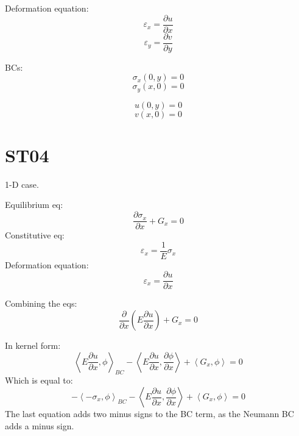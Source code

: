 \documentclass[11pt,letterpaper]{article}
\begin{document}
Deformation equation:
\begin{equation}
\varepsilon_x = \frac{\partial u}{\partial x}
\end{equation}
\begin{equation}
\varepsilon_y = \frac{\partial v}{\partial y}
\end{equation}

BCs:
\begin{equation}
\sigma_x (0, y) = 0
\end{equation}
\begin{equation}
\sigma_y (x, 0) = 0
\end{equation}

\begin{equation}
u (0, y) = 0
\end{equation}
\begin{equation}
v (x, 0) = 0
\end{equation}

\section{ST04}

1-D case.

Equilibrium eq:
\begin{equation}
\frac{\partial \sigma_x}{\partial x} + G_x = 0
\end{equation}
Constitutive eq:
\begin{equation}
\varepsilon_x = \frac{1}{E} \sigma_x
\end{equation}
Deformation equation:
\begin{equation}
\varepsilon_x = \frac{\partial u}{\partial x}
\end{equation}

Combining the eqs:
\begin{equation}
\frac{\partial}{\partial x}(E \frac{\partial u}{\partial x}) + G_x = 0
\end{equation}

In kernel form:
\begin{equation}
\left< E \frac{\partial u}{\partial x}, \phi \right>_{BC} - \left< E \frac{\partial u}{\partial x}, \frac{\partial \phi}{\partial x} \right>
+ \left< G_x , \phi \right> = 0
\end{equation}
Which is equal to:
\begin{equation}
-\left< -\sigma_x, \phi \right>_{BC} - \left< E \frac{\partial u}{\partial x}, \frac{\partial \phi}{\partial x} \right>
+ \left< G_x , \phi \right> = 0
\end{equation}
The last equation adds two minus signs to the BC term, as the Neumann BC adds a minus sign.
\end{document}
